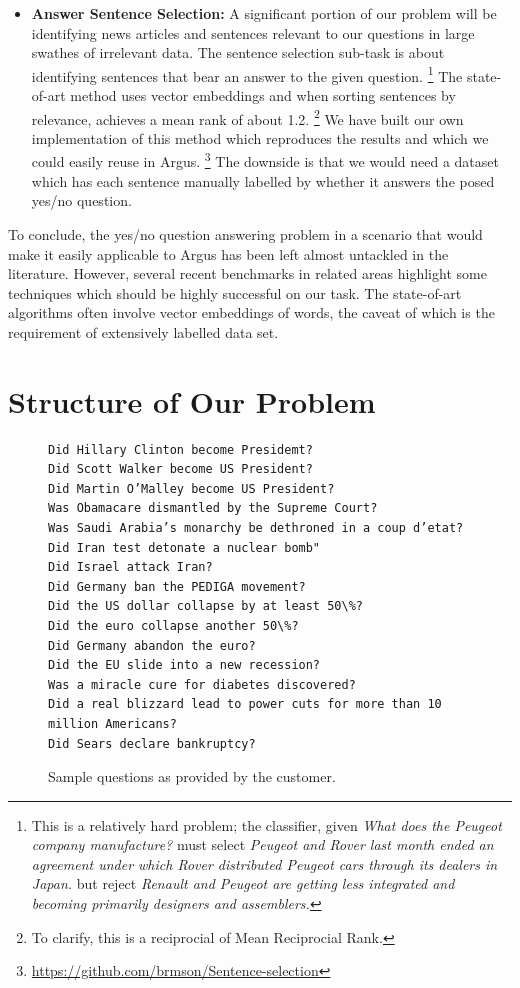 \documentclass[11pt,a4paper]{article}
\begin{document}
\begin{itemize}
	\item \textbf{Answer Sentence Selection:} A significant portion
		of our problem will be identifying news articles
		and sentences relevant to our questions in large swathes
		of irrelevant data.  The sentence selection sub-task is
		about identifying sentences that bear an answer to the
		given question.%
\footnote{This is a relatively hard problem; the
		classifier, given \textit{What does the Peugeot company manufacture?}
		must select \textit{Peugeot and Rover last month ended an agreement under which Rover distributed Peugeot cars through its dealers in Japan.}
	but reject \textit{Renault and Peugeot are getting less integrated and becoming primarily designers and assemblers.}}
		The state-of-art method \cite{Yu2014Deep} uses vector embeddings
		and when sorting sentences by relevance, achieves a mean rank
		of about 1.2.%
\footnote{To clarify, this is a reciprocial of Mean Reciprocial Rank.}
		We have built our own implementation of this method
		which reproduces the results and which we could easily
		reuse in Argus.%
\footnote{\url{https://github.com/brmson/Sentence-selection}}
		The downside is that we would need a dataset which has
		each sentence manually labelled by whether it answers
		the posed yes/no question.

\end{itemize}

To conclude, the yes/no question answering problem in a scenario that
would make it easily applicable to Argus has been left almost untackled
in the literature.  However, several recent benchmarks in related areas
highlight some techniques which should be highly successful on our task.
The state-of-art algorithms often involve vector embeddings of words,
the caveat of which is the requirement of extensively labelled data set.

\section{Structure of Our Problem}
\label{structure}

\begin{figure}
\begin{verbatim}
Did Hillary Clinton become Presidemt?
Did Scott Walker become US President?
Did Martin O’Malley become US President?
Was Obamacare dismantled by the Supreme Court?
Was Saudi Arabia’s monarchy be dethroned in a coup d’etat?
Did Iran test detonate a nuclear bomb"
Did Israel attack Iran?
Did Germany ban the PEDIGA movement?
Did the US dollar collapse by at least 50\%?
Did the euro collapse another 50\%?
Did Germany abandon the euro?
Did the EU slide into a new recession?
Was a miracle cure for diabetes discovered?
Did a real blizzard lead to power cuts for more than 10 million Americans?
Did Sears declare bankruptcy?
\end{verbatim}
	\caption{Sample questions as provided by the customer.}
	\label{fig:sampleq}
\end{figure}
\end{document}

